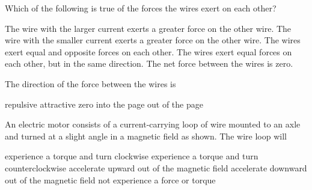 \documentclass{../../oss-apphys-exam}
\begin{document}
\begin{questions}
  \question Which of the following is true of the forces the wires exert on each
  other?
  \begin{choices}
    \choice The wire with the larger current exerts a greater force on the other
    wire.
    \choice The wire with the smaller current exerts a greater force on the
    other wire.
    \choice The wires exert equal and opposite forces on each other.
    \choice The wires exert equal forces on each other, but in the same
    direction.
    \choice The net force between the wires is zero.
  \end{choices}
  \label{q:2curr1}
    
  \question The direction of the force between the wires is
  \begin{choices}
    \choice repulsive
    \choice attractive
    \choice zero
    \choice into the page
    \choice out of the page
  \end{choices}
  \label{q:2curr2}
  
  \question An electric motor consists of a current-carrying loop of wire
  mounted to an axle and turned at a slight angle in a magnetic field as shown.
  The wire loop will
  \begin{center}
  \end{center}
  \begin{choices}
    \choice experience a torque and turn clockwise
    \choice experience a torque and turn counterclockwise
    \choice accelerate upward out of the magnetic field
    \choice accelerate downward out of the magnetic field
    \choice not experience a force or torque
  \end{choices}
  \newpage
  
  \classkickFRQinstructions


\end{questions}
\end{document}
